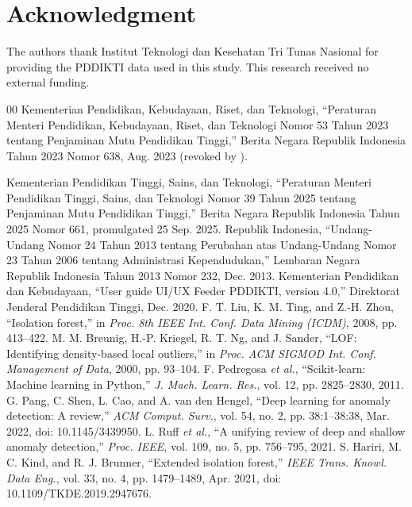 \documentclass[conference]{IEEEtran}
\newif\ifblind
\begin{document}
\ifblind\else
\section*{Acknowledgment}
The authors thank Institut Teknologi dan Kesehatan Tri Tunas Nasional for providing the PDDIKTI data used in this study. This research received no external funding.
\fi

\begin{thebibliography}{00}
 Kementerian Pendidikan, Kebudayaan, Riset, dan Teknologi, ``Peraturan Menteri Pendidikan, Kebudayaan, Riset, dan Teknologi Nomor 53 Tahun 2023 tentang Penjaminan Mutu Pendidikan Tinggi,'' Berita Negara Republik Indonesia Tahun 2023 Nomor 638, Aug. 2023 (revoked by \cite{permendiktisaintek39_2025}).
 \raggedright Kementerian Pendidikan Tinggi, Sains, dan Teknologi, ``Peraturan Menteri Pendidikan Tinggi, Sains, dan Teknologi Nomor 39 Tahun 2025 tentang Penjaminan Mutu Pendidikan Tinggi,'' Berita Negara Republik Indonesia Tahun 2025 Nomor 661, promulgated 25 Sep. 2025.
 Republik Indonesia, ``Undang-Undang Nomor 24 Tahun 2013 tentang Perubahan atas Undang-Undang Nomor 23 Tahun 2006 tentang Administrasi Kependudukan,'' Lembaran Negara Republik Indonesia Tahun 2013 Nomor 232, Dec. 2013.
 Kementerian Pendidikan dan Kebudayaan, ``User guide UI/UX Feeder PDDIKTI, version 4.0,'' Direktorat Jenderal Pendidikan Tinggi, Dec. 2020.
 F. T. Liu, K. M. Ting, and Z.-H. Zhou, ``Isolation forest,'' in \textit{Proc. 8th IEEE Int. Conf. Data Mining (ICDM)}, 2008, pp. 413--422.
 M. M. Breunig, H.-P. Kriegel, R. T. Ng, and J. Sander, ``LOF: Identifying density-based local outliers,'' in \textit{Proc. ACM SIGMOD Int. Conf. Management of Data}, 2000, pp. 93--104.
 F. Pedregosa \textit{et al.}, ``Scikit-learn: Machine learning in Python,'' \textit{J. Mach. Learn. Res.}, vol. 12, pp. 2825--2830, 2011.
 G. Pang, C. Shen, L. Cao, and A. van den Hengel, ``Deep learning for anomaly detection: A review,'' \textit{ACM Comput. Surv.}, vol. 54, no. 2, pp. 38:1--38:38, Mar. 2022, doi: 10.1145/3439950.
 L. Ruff \textit{et al.}, ``A unifying review of deep and shallow anomaly detection,'' \textit{Proc. IEEE}, vol. 109, no. 5, pp. 756--795, 2021.
 S. Hariri, M. C. Kind, and R. J. Brunner, ``Extended isolation forest,'' \textit{IEEE Trans. Knowl. Data Eng.}, vol. 33, no. 4, pp. 1479--1489, Apr. 2021, doi: 10.1109/TKDE.2019.2947676.

\end{thebibliography}
\end{document}
